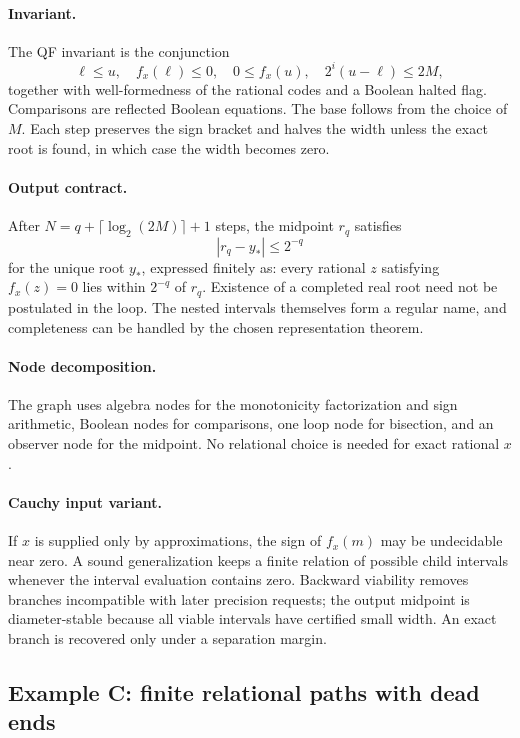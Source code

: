 \paragraph{Invariant.}
The QF invariant is the conjunction
\[
 \ell\le u,
 \quad f_x(\ell)\le0,
 \quad 0\le f_x(u),
 \quad 2^i(u-\ell)\le2M,
\]
together with well-formedness of the rational codes and a Boolean halted flag.  Comparisons are reflected Boolean equations.  The base follows from the choice of \(M\).  Each step preserves the sign bracket and halves the width unless the exact root is found, in which case the width becomes zero.
\paragraph{Output contract.}
After \(N=q+\lceil\log_2(2M)\rceil+1\) steps, the midpoint \(r_q\) satisfies
\[
 |r_q-y_*|\le2^{-q}
\]
for the unique root \(y_*\), expressed finitely as: every rational \(z\) satisfying \(f_x(z)=0\) lies within \(2^{-q}\) of \(r_q\).  Existence of a completed real root need not be postulated in the loop.  The nested intervals themselves form a regular name, and completeness can be handled by the chosen representation theorem.

\paragraph{Node decomposition.}
The graph uses algebra nodes for the monotonicity factorization and sign arithmetic, Boolean nodes for comparisons, one loop node for bisection, and an observer node for the midpoint.  No relational choice is needed for exact rational \(x\).

\paragraph{Cauchy input variant.}
If \(x\) is supplied only by approximations, the sign of \(f_x(m)\) may be undecidable near zero.  A sound generalization keeps a finite relation of possible child intervals whenever the interval evaluation contains zero.  Backward viability removes branches incompatible with later precision requests; the output midpoint is diameter-stable because all viable intervals have certified small width.  An exact branch is recovered only under a separation margin.

\subsection{Example C: finite relational paths with dead ends}

